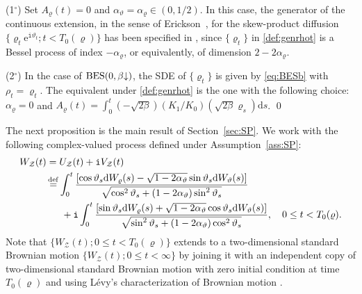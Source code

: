 \documentclass[12pt, twoside]{article}
\numberwithin{figure}{section}
\newcommand{\BES}{{\rm BES}}
\newcommand{\e}{{\mathrm e}}
\newcommand{\1}{\mathds 1}
\newcommand{\da}{{\downarrow}}
\renewcommand{\d}{{\mathrm d}}
\newcommand{\2}{{\mathbf 1}}
\renewcommand{\i}{{\mathtt i}}
\newcommand{\defeq}{{\stackrel{\rm def}{=}}}
\newcommand{\cc}{{^\circ}}
\begin{document}
\begin{eg}\label{eg:SP}
(1$\cc$) Set $A_\varrho(t)= 0$ and $\alpha_\vartheta=\alpha_\varrho\in (0,1/2)$. In this case, the generator of the continuous extension, in the sense of Erickson~\cite{Erickson}, for the skew-product diffusion $\{\varrho_t\e^{\i \vartheta_t};t<T_0(\varrho)\}$ has been specified in \cite[(8.2) of \S8 (a)]{Erickson},
 since $\{\varrho_t\}$ in \eqref{def:genrhot} is a Bessel process of index $-\alpha_\varrho$, or equivalently, of dimension $2-2\alpha_\varrho$. \smallskip 	


\noindent (2$\cc$) In the case of $\BES(0,\beta\da)$, the SDE of $\{\varrho_t\}$ is given by \eqref{eq:BESb} with $\rho_t=\varrho_t$. The equivalent under \eqref{def:genrhot} is the one with the following choice: 
$\alpha_\varrho=0$ and $A_\varrho(t)=\int_0^t(-\sqrt{2\beta})(K_1/K_0)(\sqrt{2\beta}\varrho_s)\d s$. \qed 
\end{eg}


The next proposition is the main result of Section~\ref{sec:SP}. We work with the following complex-valued process defined under Assumption~\ref{ass:SP}:
\begin{align}
\begin{split}\label{def:BZBM}
W_{\mathcal Z}(t)&=U_{\mathcal Z}(t)+\i V_{\mathcal Z}(t)\\
&\,\defeq\int_0^t \frac{[\cos \vartheta_s\d W_\varrho(s)-\sqrt{1-2\alpha_\vartheta}\sin \vartheta_s\d W_\vartheta(s)]}{\sqrt{\cos^2\vartheta_s+(1-2\alpha_\vartheta)\sin^2\vartheta_s}}\\
&\quad\;\;+\i\int_0^t \frac{[\sin \vartheta_s\d W_\varrho(s)+\sqrt{1-2\alpha_\vartheta}\cos \vartheta_s\d W_\vartheta(s)]}{\sqrt{\sin^2\vartheta_s+(1-2\alpha_\vartheta)\cos^2\vartheta_s}},\quad 0\leq t<T_0(\varrho).
\end{split}
\end{align}
Note that $\{W_{\mathcal Z}(t);0\leq t<T_0(\varrho)\}$ extends to a two-dimensional standard Brownian motion $\{W_{\mathcal Z}(t);0\leq t<\infty\}$ by joining it with an independent copy of two-dimensional standard Brownian motion with zero initial condition at time $T_0(\varrho)$ and using L\'evy's characterization of Brownian motion \cite[(3.6) Theorem, p.150]{RY}. 
 
\end{document}
